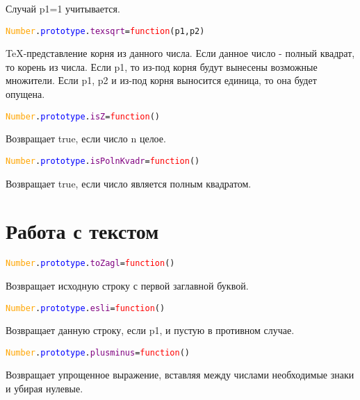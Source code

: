 	Случай p1=1 учитывается.
		\begin{alltt}
			\textcolor{Orange}{Number}.\textcolor{Blue}{prototype}.\textcolor{Purple}{texsqrt}=\textcolor{Red}{function}(p1,p2)
		\end{alltt}	
	TeX-представление корня из данного числа.
	Если данное число - полный квадрат, то корень из числа.
	Если p1, то из-под корня будут вынесены возможные множители.
	Если p1, p2 и из-под корня выносится единица, то она будет опущена.
		\begin{alltt}
			\textcolor{Orange}{Number}.\textcolor{Blue}{prototype}.\textcolor{Purple}{isZ}=\textcolor{Red}{function}()
		\end{alltt}	
	Возвращает true, если число n целое.
		\begin{alltt}
			\textcolor{Orange}{Number}.\textcolor{Blue}{prototype}.\textcolor{Purple}{isPolnKvadr}=\textcolor{Red}{function}()
		\end{alltt}	
	Возвращает true, если число является полным квадратом.
	\section{Работа с текстом}
		\begin{alltt}
			\textcolor{Orange}{Number}.\textcolor{Blue}{prototype}.\textcolor{Purple}{toZagl}=\textcolor{Red}{function}()
		\end{alltt}	
	Возвращает исходную строку с первой заглавной буквой.
		\begin{alltt}
			\textcolor{Orange}{Number}.\textcolor{Blue}{prototype}.\textcolor{Purple}{esli}=\textcolor{Red}{function}()
		\end{alltt}	
	Возвращает данную строку, если p1, и пустую в противном случае.
		\begin{alltt}
			\textcolor{Orange}{Number}.\textcolor{Blue}{prototype}.\textcolor{Purple}{plusminus}=\textcolor{Red}{function}()
		\end{alltt}	
	Возвращает упрощенное выражение, вставляя между числами необходимые знаки и убирая нулевые. 
